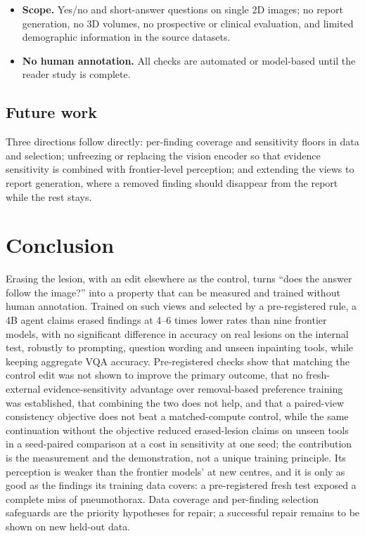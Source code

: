 \documentclass[11pt]{article}
\begin{document}
\begin{itemize}[leftmargin=*,nosep]
\item \textbf{Scope.} Yes/no and short-answer questions on single 2D images; no report generation, no 3D volumes, no prospective or clinical evaluation, and limited demographic information in the source datasets.
\item \textbf{No human annotation.} All checks are automated or model-based until the reader study is complete.
\end{itemize}

\subsection{Future work}
Three directions follow directly: per-finding coverage and sensitivity floors in data and selection; unfreezing or replacing the vision encoder so that evidence sensitivity is combined with frontier-level perception; and extending the views to report generation, where a removed finding should disappear from the report while the rest stays.

\section{Conclusion}
Erasing the lesion, with an edit elsewhere as the control, turns ``does the answer follow the image?'' into a property that can be measured and trained without human annotation. Trained on such views and selected by a pre-registered rule, a 4B agent claims erased findings at 4--6 times lower rates than nine frontier models, with no significant difference in accuracy on real lesions on the internal test, robustly to prompting, question wording and unseen inpainting tools, while keeping aggregate VQA accuracy. Pre-registered checks show that matching the control edit was not shown to improve the primary outcome, that no fresh-external evidence-sensitivity advantage over removal-based preference training was established, that combining the two does not help, and that a paired-view consistency objective does not beat a matched-compute control, while the same continuation without the objective reduced erased-lesion claims on unseen tools in a seed-paired comparison at a cost in sensitivity at one seed; the contribution is the measurement and the demonstration, not a unique training principle. Its perception is weaker than the frontier models' at new centres, and it is only as good as the findings its training data covers: a pre-registered fresh test exposed a complete miss of pneumothorax. Data coverage and per-finding selection safeguards are the priority hypotheses for repair; a successful repair remains to be shown on new held-out data.
\end{document}
